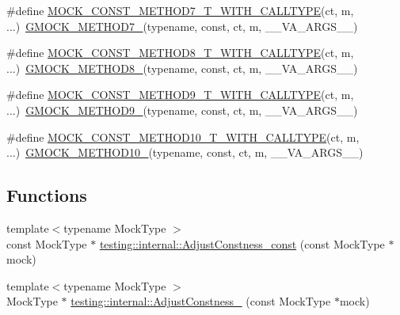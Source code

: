 \begin{DoxyCompactItemize}
\item 
\#define \mbox{\hyperlink{gmock-generated-function-mockers_8h_ac041233126a7740a136fc7a9737613dd}{M\+O\+C\+K\+\_\+\+C\+O\+N\+S\+T\+\_\+\+M\+E\+T\+H\+O\+D7\+\_\+\+T\+\_\+\+W\+I\+T\+H\+\_\+\+C\+A\+L\+L\+T\+Y\+PE}}(ct,  m, ...)~\mbox{\hyperlink{gmock-generated-function-mockers_8h_ab98a8399ba62b53b375c2807f4d39d2f}{G\+M\+O\+C\+K\+\_\+\+M\+E\+T\+H\+O\+D7\+\_\+}}(typename, const, ct, m, \+\_\+\+\_\+\+V\+A\+\_\+\+A\+R\+G\+S\+\_\+\+\_\+)
\item 
\#define \mbox{\hyperlink{gmock-generated-function-mockers_8h_aa4ed75d9f9d23eb0a00543d3ac1ed093}{M\+O\+C\+K\+\_\+\+C\+O\+N\+S\+T\+\_\+\+M\+E\+T\+H\+O\+D8\+\_\+\+T\+\_\+\+W\+I\+T\+H\+\_\+\+C\+A\+L\+L\+T\+Y\+PE}}(ct,  m, ...)~\mbox{\hyperlink{gmock-generated-function-mockers_8h_aa84a36427c44505207b7cad5dec7ad67}{G\+M\+O\+C\+K\+\_\+\+M\+E\+T\+H\+O\+D8\+\_\+}}(typename, const, ct, m, \+\_\+\+\_\+\+V\+A\+\_\+\+A\+R\+G\+S\+\_\+\+\_\+)
\item 
\#define \mbox{\hyperlink{gmock-generated-function-mockers_8h_afb8878388e0875e109d1fd6902471780}{M\+O\+C\+K\+\_\+\+C\+O\+N\+S\+T\+\_\+\+M\+E\+T\+H\+O\+D9\+\_\+\+T\+\_\+\+W\+I\+T\+H\+\_\+\+C\+A\+L\+L\+T\+Y\+PE}}(ct,  m, ...)~\mbox{\hyperlink{gmock-generated-function-mockers_8h_aa820171a19cc587c247dbe05cbffc55f}{G\+M\+O\+C\+K\+\_\+\+M\+E\+T\+H\+O\+D9\+\_\+}}(typename, const, ct, m, \+\_\+\+\_\+\+V\+A\+\_\+\+A\+R\+G\+S\+\_\+\+\_\+)
\item 
\#define \mbox{\hyperlink{gmock-generated-function-mockers_8h_af697bae09aedcdfb3d6897081efe7541}{M\+O\+C\+K\+\_\+\+C\+O\+N\+S\+T\+\_\+\+M\+E\+T\+H\+O\+D10\+\_\+\+T\+\_\+\+W\+I\+T\+H\+\_\+\+C\+A\+L\+L\+T\+Y\+PE}}(ct,  m, ...)~\mbox{\hyperlink{gmock-generated-function-mockers_8h_a81a48223a8771de36ef92ac6d56f6e81}{G\+M\+O\+C\+K\+\_\+\+M\+E\+T\+H\+O\+D10\+\_\+}}(typename, const, ct, m, \+\_\+\+\_\+\+V\+A\+\_\+\+A\+R\+G\+S\+\_\+\+\_\+)
\end{DoxyCompactItemize}
\subsection*{Functions}
\begin{DoxyCompactItemize}
\item 
{\footnotesize template$<$typename Mock\+Type $>$ }\\const Mock\+Type $\ast$ \mbox{\hyperlink{namespacetesting_1_1internal_a018d17632278ac8fc2c9dcaaf629b62d}{testing\+::internal\+::\+Adjust\+Constness\+\_\+const}} (const Mock\+Type $\ast$mock)
\item 
{\footnotesize template$<$typename Mock\+Type $>$ }\\Mock\+Type $\ast$ \mbox{\hyperlink{namespacetesting_1_1internal_afbaa05a53fd7fa8be3ae1320dcd01754}{testing\+::internal\+::\+Adjust\+Constness\+\_\+}} (const Mock\+Type $\ast$mock)
\end{DoxyCompactItemize}


